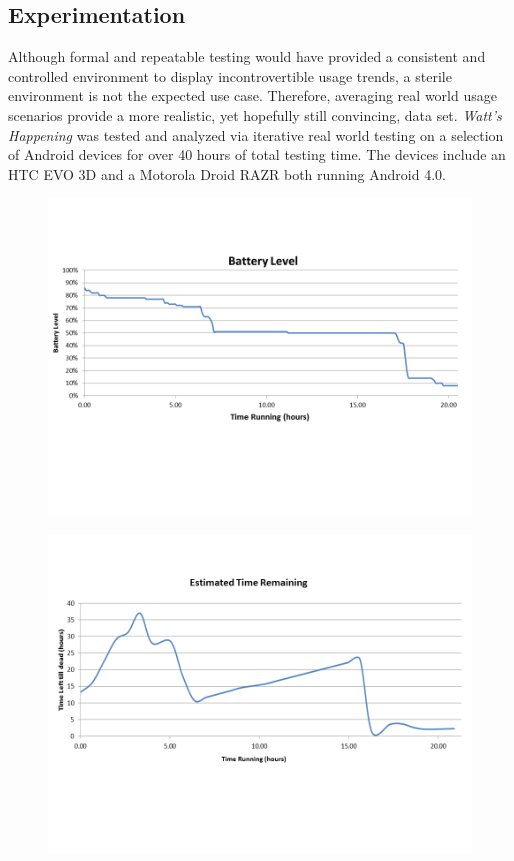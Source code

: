 \subsection{Experimentation}
Although formal and repeatable testing would have provided a consistent and controlled environment to display incontrovertible usage trends, a sterile environment is not the expected use case.
Therefore, averaging real world usage scenarios provide a more realistic, yet hopefully still convincing, data set.
\emph{Watt's Happening} was tested and analyzed via iterative real world testing on a selection of Android devices for over 40 hours of total testing time.
The devices include an HTC EVO 3D and a Motorola Droid RAZR both running Android 4.0. 

\begin{figure}[ht!]
	\begin{center}
		\includegraphics[width=\columnwidth]{figs/battery_level.png}
		\caption{}
		\label{fig:bat_level}
\end{center}
\end{figure}
\begin{figure}[ht!]
	\begin{center}
		\includegraphics[width=\columnwidth]{figs/est_time_remaining.png}
		\caption{}
		\label{fig:est_remaining}
\end{center}
\end{figure}
